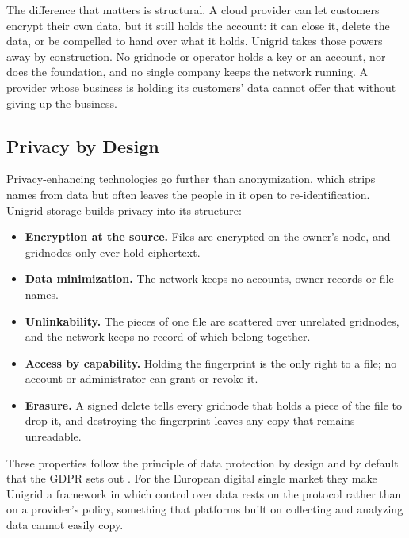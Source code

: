 \documentclass[a4paper,oneside]{article}
\begin{document}
\noindent The difference that matters is structural. A cloud provider can let customers encrypt their own data, but it still holds the account: it can close it, delete the data, or be compelled to hand over what it holds. Unigrid takes those powers away by construction. No gridnode or operator holds a key or an account, nor does the foundation, and no single company keeps the network running. A provider whose business is holding its customers' data cannot offer that without giving up the business.

\subsection{Privacy by Design}
Privacy-enhancing technologies go further than anonymization, which strips names from data but often leaves the people in it open to re-identification. Unigrid storage builds privacy into its structure:

\begin{itemize}
	\item \textbf{Encryption at the source.} Files are encrypted on the owner's node, and gridnodes only ever hold ciphertext.
	\item \textbf{Data minimization.} The network keeps no accounts, owner records or file names.
	\item \textbf{Unlinkability.} The pieces of one file are scattered over unrelated gridnodes, and the network keeps no record of which belong together.
	\item \textbf{Access by capability.} Holding the fingerprint is the only right to a file; no account or administrator can grant or revoke it.
	\item \textbf{Erasure.} A signed delete tells every gridnode that holds a piece of the file to drop it, and destroying the fingerprint leaves any copy that remains unreadable.
\end{itemize}

\noindent These properties follow the principle of data protection by design and by default that the GDPR sets out \cite{gdpr2016}. For the European digital single market they make Unigrid a framework in which control over data rests on the protocol rather than on a provider's policy, something that platforms built on collecting and analyzing data cannot easily copy.
\end{document}
